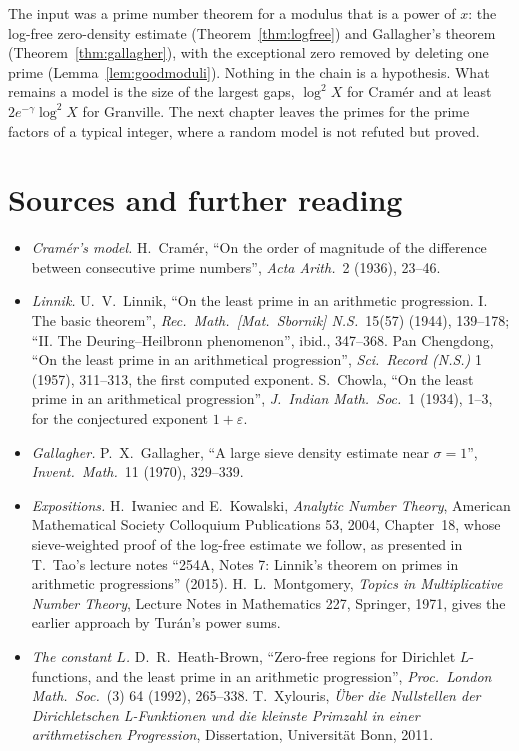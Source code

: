 The input was a prime number theorem for a modulus that is a power of $x$: the log-free zero-density estimate (Theorem~\ref{thm:logfree}) and Gallagher's theorem (Theorem~\ref{thm:gallagher}), with the exceptional zero removed by deleting one prime (Lemma~\ref{lem:goodmoduli}). Nothing in the chain is a hypothesis. What remains a model is the size of the largest gaps, $\log^2X$ for Cram\'er and at least $2e^{-\gamma}\log^2X$ for Granville. The next chapter leaves the primes for the prime factors of a typical integer, where a random model is not refuted but proved.

\section*{Sources and further reading}

\begin{itemize}
\item \emph{Cram\'er's model.} H.~Cram\'er, ``On the order of magnitude of the difference between consecutive prime numbers'', \emph{Acta Arith.}\ 2 (1936), 23--46.
\item \emph{Linnik.} U.~V.~Linnik, ``On the least prime in an arithmetic progression. I. The basic theorem'', \emph{Rec.\ Math.\ [Mat.\ Sbornik] N.S.}\ 15(57) (1944), 139--178; ``II. The Deuring--Heilbronn phenomenon'', ibid., 347--368. Pan Chengdong, ``On the least prime in an arithmetical progression'', \emph{Sci.\ Record (N.S.)} 1 (1957), 311--313, the first computed exponent. S.~Chowla, ``On the least prime in an arithmetical progression'', \emph{J.\ Indian Math.\ Soc.}\ 1 (1934), 1--3, for the conjectured exponent $1+\varepsilon$.
\item \emph{Gallagher.} P.~X.~Gallagher, ``A large sieve density estimate near $\sigma=1$'', \emph{Invent.\ Math.}\ 11 (1970), 329--339.
\item \emph{Expositions.} H.~Iwaniec and E.~Kowalski, \emph{Analytic Number Theory}, American Mathematical Society Colloquium Publications 53, 2004, Chapter~18, whose sieve-weighted proof of the log-free estimate we follow, as presented in T.~Tao's lecture notes ``254A, Notes 7: Linnik's theorem on primes in arithmetic progressions'' (2015). H.~L.~Montgomery, \emph{Topics in Multiplicative Number Theory}, Lecture Notes in Mathematics 227, Springer, 1971, gives the earlier approach by Turán's power sums.
\item \emph{The constant $L$.} D.~R.~Heath-Brown, ``Zero-free regions for Dirichlet $L$-functions, and the least prime in an arithmetic progression'', \emph{Proc.\ London Math.\ Soc.}\ (3) 64 (1992), 265--338. T.~Xylouris, \emph{Über die Nullstellen der Dirichletschen L-Funktionen und die kleinste Primzahl in einer arithmetischen Progression}, Dissertation, Universität Bonn, 2011.

\end{itemize}

